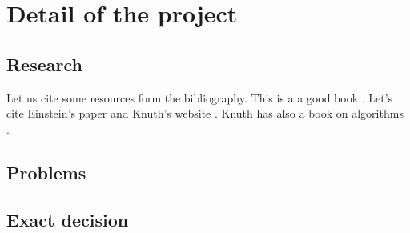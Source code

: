 \chapter{Detail of the project }\label{ch:A}
\section{Research }
Let us cite some resources form the  bibliography. This is a a good book \cite{dirac}. Let's cite Einstein's paper \cite{einstein} and Knuth's website \cite{knuthwebsite}. Knuth has also a book on algorithms \cite{knuth-fa}.
\section{Problems}
\section{Exact decision}